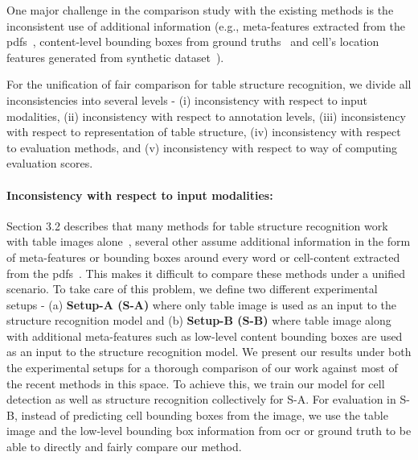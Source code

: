 \documentclass[runningheads]{llncs}
\begin{document}
One major challenge in the comparison study with the existing methods is the inconsistent use of additional information (e.g., meta-features extracted from the {\sc pdf}s~\cite{table_splitting}, content-level bounding boxes from ground truths~\cite{paliwal2019tablenet,chi2019complicated} and cell's location features generated from synthetic dataset~\cite{qasim2019rethinking}). 

For the unification of fair comparison for table structure recognition, we divide all inconsistencies into several levels - (i) inconsistency with respect to input modalities, (ii) inconsistency with respect to annotation levels, (iii) inconsistency with respect to representation of table structure, (iv) inconsistency with respect to evaluation methods, and (v) inconsistency with respect to way of computing evaluation scores.

\paragraph{\textbf{Inconsistency with respect to input modalities:}} Section 3.2 describes that many methods for table structure recognition work with table images alone~\cite{schreiber2017deepdesrt,table_splitting,Khan_2019}, several other assume additional information in the form of meta-features or bounding boxes around every word or cell-content extracted from the {\sc pdf}s~\cite{qasim2019rethinking,paliwal2019tablenet,chi2019complicated}. This makes it difficult to compare these methods under a unified scenario. To take care of this problem, we define two different experimental setups - (a) \textbf{Setup-A (S-A)} where only table image is used as an input to the structure recognition model and (b) \textbf{Setup-B (S-B)} where table image along with additional meta-features such as low-level content bounding boxes are used as an input to the structure recognition model. We present our results under both the experimental setups for a thorough comparison of our work against most of the recent methods in this space. To achieve this, we train our model for cell detection as well as structure recognition collectively for S-A. For evaluation in S-B, instead of predicting cell bounding boxes from the image, we use the table image and the low-level bounding box information from {\sc ocr} or ground truth to be able to directly and fairly compare our method.
    
\end{document}
